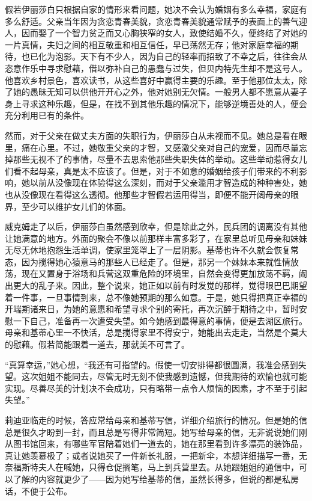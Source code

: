 \par 假若伊丽莎白只根据自家的情形来看问题，她决不会认为婚姻有多么幸福，家庭有多么舒适。父亲当年因为贪恋青春美貌，贪恋青春美貌通常赋予的表面上的善气迎人，因而娶了一个智力贫乏而又心胸狭窄的女人，致使结婚不久，便终结了对她的一片真情，夫妇之间的相互敬重和相互信任，早已荡然无存；他对家庭幸福的期待，也已化为泡影。天下有不少人，因为自己的轻率而招致了不幸之后，往往会从恣意作乐中寻求慰藉，借以弥补自己的愚蠢与过失，但贝内特先生却不是这号人。他喜欢乡村景色，喜欢读书，从这些喜好中赢得主要的乐趣。至于他那位太太，除了她的愚昧无知可以供他开开心之外，他对她别无欠情。一般男人都不愿意从妻子身上寻求这种乐趣，但是，在找不到其他乐趣的情况下，能够逆境善处的人，便会充分利用已有的条件。
\par 然而，对于父亲在做丈夫方面的失职行为，伊丽莎白从未视而不见。她总是看在眼里，痛在心里。不过，她敬重父亲的才智，又感激父亲对自己的宠爱，因而尽量忘掉那些无视不了的事情，尽量不去思索他那些失职失体的举动。这些举动惹得女儿们看不起母亲，真是太不应该了。但是，对于不如意的婚姻给孩子们带来的不利影响，她以前从没像现在体验得这么深刻，而对于父亲滥用才智造成的种种害处，她也从没像现在看得这么透彻。他那些才智假若运用得当，即便不能开阔母亲的眼界，至少可以维护女儿们的体面。
\par 威克姆走了以后，伊丽莎白虽然感到欣幸，但是除此之外，民兵团的调离没有其他让她满意的地方。外面的聚会不像以前那样丰富多彩了，在家里总听见母亲和妹妹无尽无休地抱怨生活单调，使家里笼罩上了一层阴影。基蒂也许不久就会恢复常态，因为搅得她心猿意马的那些人已经走了。但是，那另一个妹妹本来就性情放荡，现在又置身于浴场和兵营这双重危险的环境里，自然会变得更加放荡不羁，闹出更大的乱子来。因此，整个说来，她正如以前有时发觉的那样，觉得眼巴巴期望着一件事，一旦事情到来，总不像她预期的那么如意。于是，她只得把真正幸福的开端期诸来日，为她的意愿和希望寻求个别的寄托，再次沉醉于期待之中，暂时安慰一下自己，准备再一次遭受失望。如今她感到最得意的事情，便是去湖区旅行。母亲和基蒂心里一不快活，总是搅得家里不得安宁，她能出去走走，当然是个莫大的慰藉。假若简能跟着一道去，那就美不可言了。
\par “真算幸运，”她心想，“我还有可指望的。假使一切安排得都很圆满，我准会感到失望。这次姐姐不能同去，尽管无时无刻不使我感到遗憾，但我期待的欢愉也就可能实现。尽善尽美的计划决不会成功，只有略带一点令人烦恼的因素，才不至于引起失望。”
\par 莉迪亚临走的时候，答应常给母亲和基蒂写信，详细介绍旅行的情况。但是她的信总是很久才盼到一封，而且总是写得非常简短。她写给母亲的信，无非说说她们刚从图书馆回来，有哪些军官陪着她们一道去的，她在那里看到许多漂亮的装饰品，真让她羡慕极了；或者说她买了一件新长礼服，一把新伞，本想详细描写一番，无奈福斯特夫人在喊她，只得仓促搁笔，马上到兵营里去。从她跟姐姐的通信中，可以了解的内容就更少了——因为她写给基蒂的信，虽然长得多，但说的都是私房话，不便于公布。
